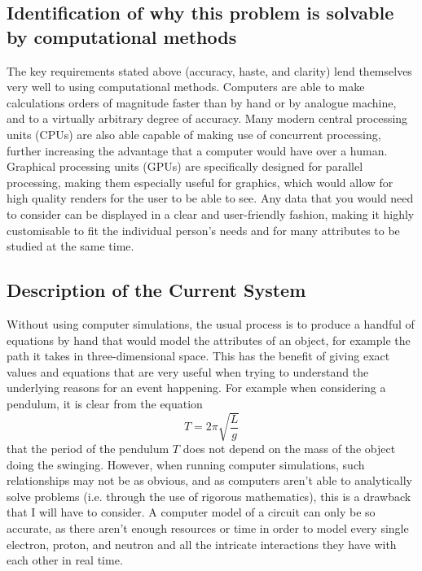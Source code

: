 \documentclass[tikz, 11pt]{article}
\begin{document}
        \subsection{Identification of why this problem is solvable by computational methods}
            The key requirements stated above (accuracy, haste, and clarity) lend themselves very well to using computational methods. Computers are able to make calculations orders of magnitude faster than by hand or by analogue machine, and to a virtually arbitrary degree of accuracy. Many modern central processing units (CPUs) are also able capable of making use of concurrent processing, further increasing the advantage that a computer would have over a human. Graphical processing units (GPUs) are specifically designed for parallel processing, making them especially useful for graphics, which would allow for high quality renders for the user to be able to see. Any data that you would need to consider can be displayed in a clear and user-friendly fashion, making it highly customisable to fit the individual person's needs and for many attributes to be studied at the same time.

        \subsection{Description of the Current System}
            Without using computer simulations, the usual process is to produce a handful of equations by hand that would model the attributes of an object, for example the path it takes in three-dimensional space. This has the benefit of giving exact values and equations that are very useful when trying to understand the underlying reasons for an event happening. For example when considering a pendulum, it is clear from the equation $$ T = 2 \pi \sqrt{\frac{L}{g}} $$ that the period of the pendulum $T$ does not depend on the mass of the object doing the swinging. However, when running computer simulations, such relationships may not be as obvious, and as computers aren't able to analytically solve problems (i.e. through the use of rigorous mathematics), this is a drawback that I will have to consider. A computer model of a circuit can only be so accurate, as there aren't enough resources or time in order to model every single electron, proton, and neutron and all the intricate interactions they have with each other in real time.
            
\end{document}
